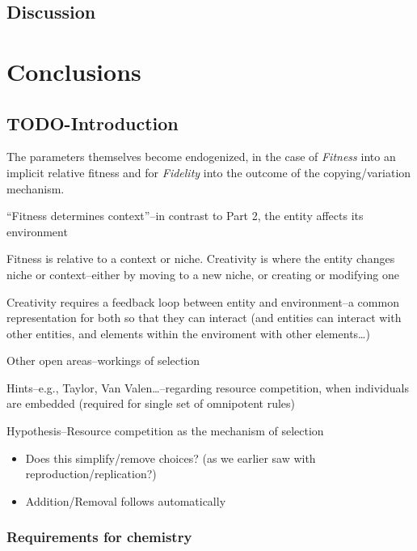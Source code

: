 \chapter{Discussion}


\part{Conclusions}\label{the-search-for-creativity}

\chapter{TODO-Introduction}

The parameters themselves become endogenized, in the case of \emph{Fitness} into an implicit relative fitness and for \emph{Fidelity} into the outcome of the copying/variation mechanism.

``Fitness determines context''--in contrast to Part 2, the entity affects its environment

Fitness is relative to a context or niche. Creativity is where the
entity changes niche or context--either by moving to a new niche, or
creating or modifying one

Creativity requires a feedback loop between entity and environment--a
common representation for both so that they can interact (and entities
can interact with other entities, and elements within the enviroment
with other elements\ldots{})

Other open areas--workings of selection

Hints--e.g., Taylor, Van Valen\ldots{}--regarding resource
competition, when individuals are embedded (required for single set of
omnipotent rules)

Hypothesis--Resource competition as the mechanism of selection

\begin{itemize}
	\item
 Does this simplify/remove choices? (as we earlier saw with
 reproduction/replication?)
	\item
 Addition/Removal follows automatically
\end{itemize}

\section{Requirements for chemistry}\label{requirements-for-chemistry}

